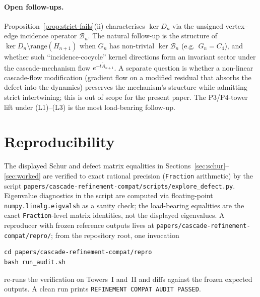 \documentclass[11pt]{article}
\theoremstyle{plain}
\theoremstyle{definition}
\theoremstyle{remark}
\begin{document}
\paragraph*{Open follow-ups.}
Proposition~\ref{prop:strict-fails}(ii) characterises $\ker D_n$ via
the unsigned vertex--edge incidence operator $\mathcal{B}_n$. The natural
follow-up is the structure of $\ker D_n \setminus \mathrm{range}(H_{n+1})$
when $G_n$ has non-trivial $\ker \mathcal{B}_n$ (e.g.\ $G_n = C_4$), and
whether such ``incidence-cocycle'' kernel directions form an
invariant sector under the cascade-mechanism flow
$e^{-t \widetilde A_{n+1}}$. A separate question is
whether a non-linear cascade-flow modification (gradient flow on a
modified residual that absorbs the defect into the dynamics)
preserves the mechanism's structure while admitting strict
intertwining; this is out of scope for the present paper. The
P3/P4-tower lift under \textup{(L1)}--\textup{(L3)} is the most
load-bearing follow-up.

\section{Reproducibility}\label{sec:repro}

The displayed Schur and defect matrix equalities in
Sections~\ref{sec:schur}--\ref{sec:worked} are verified to exact rational
precision (\texttt{Fraction} arithmetic) by the script
\texttt{papers/cascade-refinement-compat/scripts/explore\_defect.py}.
Eigenvalue diagnostics in the script are computed via
floating-point \texttt{numpy.linalg.eigvalsh} as a sanity check; the
load-bearing equalities are the exact \texttt{Fraction}-level
matrix identities, not the displayed eigenvalues.
A reproducer with frozen reference outputs lives at
\texttt{papers/cascade-refinement-compat/repro/}; from the
repository root, one invocation
\begin{verbatim}
cd papers/cascade-refinement-compat/repro
bash run_audit.sh
\end{verbatim}
re-runs the verification on Towers~I and~II and diffs against the
frozen expected outputs. A clean run prints
\texttt{REFINEMENT COMPAT AUDIT PASSED}.



\end{document}
